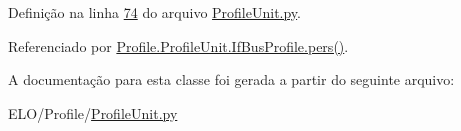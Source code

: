 Definição na linha \hyperlink{ProfileUnit_8py_source_l00074}{74} do arquivo \hyperlink{ProfileUnit_8py_source}{Profile\-Unit.\-py}.



Referenciado por \hyperlink{classProfile_1_1ProfileUnit_1_1IfBusProfile_a996592f4b01e0540f45d042065d5a7f4}{Profile.\-Profile\-Unit.\-If\-Bus\-Profile.\-pers()}.



A documentação para esta classe foi gerada a partir do seguinte arquivo\-:\begin{DoxyCompactItemize}
\item 
E\-L\-O/\-Profile/\hyperlink{ProfileUnit_8py}{Profile\-Unit.\-py}\end{DoxyCompactItemize}
